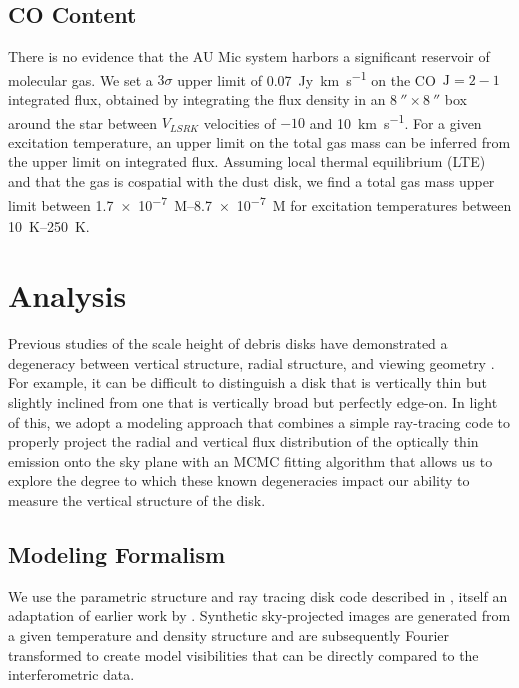 \documentclass[modern]{aastex62}
\begin{document}
\subsection{CO Content}
\label{subsection: gas}

There is no evidence that the AU Mic system harbors a significant reservoir of molecular gas.
We set a $3 \sigma$ upper limit of \SI{0.07}{Jy.km.s^{-1}} on the CO~$\mathrm{J}=2-1$ integrated flux, obtained by integrating the flux density in an $\SI{8}{\arcsecond} \times \SI{8}{\arcsecond}$ box around the star between $V_{LSRK}$ velocities of $-10$ and \SI{10}{km.s^{-1}}.
For a given excitation temperature, an upper limit on the total gas mass can be inferred from the upper limit on integrated flux.
Assuming local thermal equilibrium (LTE) and that the gas is cospatial with the dust disk, we find a total gas mass upper limit between \SIrange[range-phrase=\ and\ ]{1.7e-7}{8.7e-7}{M_\earth} for excitation temperatures between \SIrange[range-phrase=\ and\ ]{10}{250}{K}.



\section{Analysis}
\label{section: analysis}
Previous studies of the scale height of debris disks have demonstrated a degeneracy between vertical structure, radial structure, and viewing geometry \citep[e.g.][]{milli14}.  
For example, it can be difficult to distinguish a disk that is vertically thin but slightly inclined from one that is vertically broad but perfectly edge-on.
In light of this, we adopt a modeling approach that combines a simple ray-tracing code to properly project the radial and vertical flux distribution of the optically thin emission onto the sky plane with an MCMC fitting algorithm that allows us to explore the degree to which these known degeneracies impact our ability to measure the vertical structure of the disk.  

\subsection{Modeling Formalism}

We use the parametric structure and ray tracing disk code described in \citet{flaherty15}, itself an adaptation of earlier work by \citet{rosenfeld13}.
Synthetic sky-projected images are generated from a given temperature and density structure and are subsequently Fourier transformed to create model visibilities that can be directly compared to the interferometric data.
\end{document}
